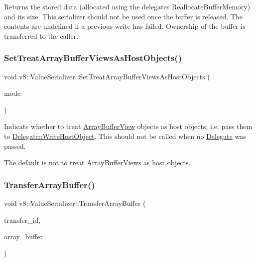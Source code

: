 Returns the stored data (allocated using the delegate\textquotesingle{}s Reallocate\+Buffer\+Memory) and its size. This serializer should not be used once the buffer is released. The contents are undefined if a previous write has failed. Ownership of the buffer is transferred to the caller. \mbox{\label{classv8_1_1ValueSerializer_ae5e570983dfe928e15d6cc56755248c4}} 
\subsubsection{\texorpdfstring{Set\+Treat\+Array\+Buffer\+Views\+As\+Host\+Objects()}{SetTreatArrayBufferViewsAsHostObjects()}}
{\footnotesize\ttfamily void v8\+::\+Value\+Serializer\+::\+Set\+Treat\+Array\+Buffer\+Views\+As\+Host\+Objects (\begin{DoxyParamCaption}\item[{bool}]{mode }\end{DoxyParamCaption})}

Indicate whether to treat \mbox{\hyperlink{classv8_1_1ArrayBufferView}{Array\+Buffer\+View}} objects as host objects, i.\+e. pass them to \mbox{\hyperlink{classv8_1_1ValueSerializer_1_1Delegate_ae97808060b22d7a94517f725922b72c6}{Delegate\+::\+Write\+Host\+Object}}. This should not be called when no \mbox{\hyperlink{classv8_1_1ValueSerializer_1_1Delegate}{Delegate}} was passed.

The default is not to treat Array\+Buffer\+Views as host objects. \mbox{\label{classv8_1_1ValueSerializer_a27007f2530a496275ccf7b8846f1d9c5}} 
\subsubsection{\texorpdfstring{Transfer\+Array\+Buffer()}{TransferArrayBuffer()}}
{\footnotesize\ttfamily void v8\+::\+Value\+Serializer\+::\+Transfer\+Array\+Buffer (\begin{DoxyParamCaption}\item[{uint32\+\_\+t}]{transfer\+\_\+id,  }\item[{\mbox{\hyperlink{classv8_1_1Local}{Local}}$<$ \mbox{\hyperlink{classv8_1_1ArrayBuffer}{Array\+Buffer}} $>$}]{array\+\_\+buffer }\end{DoxyParamCaption})}

